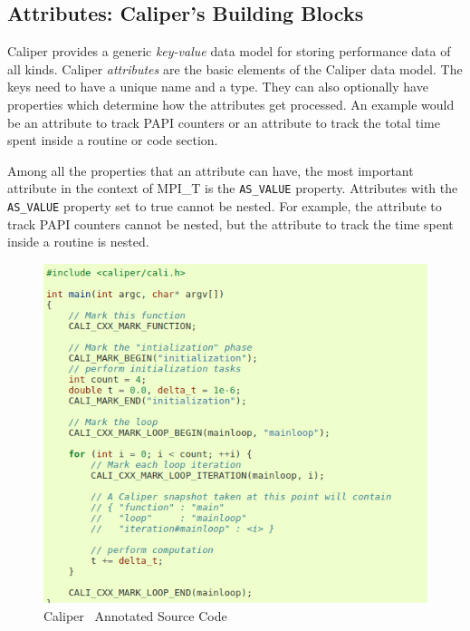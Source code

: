 \subsection{Attributes: Caliper's Building Blocks}
Caliper provides a generic \textit{key-value} data model for storing performance data of all kinds. Caliper \textit{attributes} are the basic elements of the Caliper data model. The keys need to have a unique name and a type. They can also optionally have properties which determine how the attributes get processed. An example would be an attribute to track PAPI counters or an attribute to track the total time spent inside a routine or code section. 
\par Among all the properties that an attribute can have, the most important attribute in the context of MPI\_T is the \verb+AS_VALUE+ property. Attributes with the \verb+AS_VALUE+ property set to true cannot be nested. For example, the attribute to track PAPI counters cannot be nested, but the attribute to track the time spent inside a routine is nested.
\begin{center}
	\begin{figure}[tbp!]
         \centering
		\includegraphics[scale=0.3, width=\columnwidth, keepaspectratio]{figures/cali-example}
		\caption{Caliper~\cite{CALIPER} Annotated Source Code}
		\label{fig:caliexample}
	\end{figure}
\end{center}


